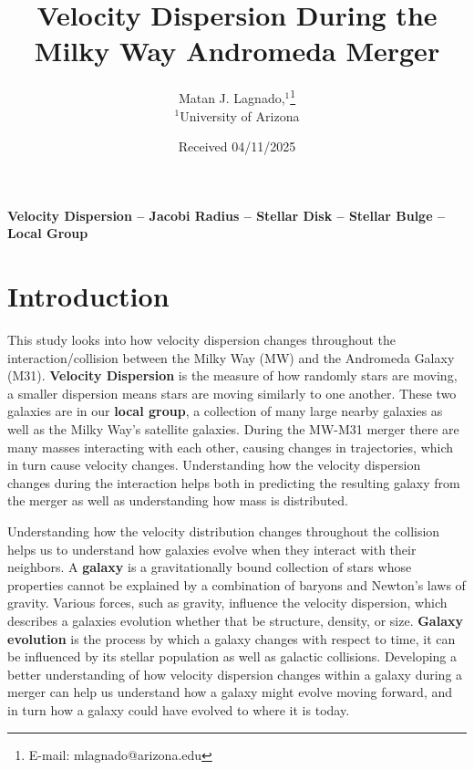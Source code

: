 \documentclass[fleqn,usenatbib]{mnras}
\title[Short title, max. 45 characters]{Velocity Dispersion During the Milky Way Andromeda Merger}
\author[M. J. Lagnado et al.]{
Matan J. Lagnado,$^{1}$\thanks{E-mail: mlagnado@arizona.edu}
\\
$^{1}$University of Arizona\\
}
\date{Received 04/11/2025}
\begin{document}
\label{firstpage}
\pagerange{\pageref{firstpage}--\pageref{lastpage}}
\maketitle


\begin{keywords}
\textbf{Velocity Dispersion -- Jacobi Radius -- Stellar Disk -- Stellar Bulge -- Local Group}
\end{keywords}



\section{Introduction}

This study looks into how velocity dispersion changes throughout the interaction/collision between the Milky Way (MW) and the Andromeda Galaxy (M31). \textbf{Velocity Dispersion} is the measure of how randomly stars are moving, a smaller dispersion means stars are moving similarly to one another. These two galaxies are in our \textbf{local group}, a collection of many large nearby galaxies as well as the Milky Way's satellite galaxies. During the MW-M31 merger there are many masses interacting with each other, causing changes in trajectories, which in turn cause velocity changes. Understanding how the velocity dispersion changes during the interaction helps both in predicting the resulting galaxy from the merger as well as understanding how mass is distributed.

Understanding how the velocity distribution changes throughout the collision helps us to understand how galaxies evolve when they interact with their neighbors. A \textbf{galaxy} is a gravitationally bound collection of stars whose properties cannot be explained by a combination of baryons and Newton's laws of gravity.\cite{Willman_2012} Various forces, such as gravity, influence the velocity dispersion, which describes a galaxies evolution whether that be structure, density, or size. \textbf{Galaxy evolution} is the process by which a galaxy changes with respect to time, it can be influenced by its stellar population as well as galactic collisions. Developing a better understanding of how velocity dispersion changes within a galaxy during a merger can help us understand how a galaxy might evolve moving forward, and in turn how a galaxy could have evolved to where it is today.
\end{document}
